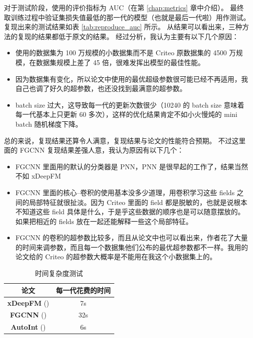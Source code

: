 \documentclass[degree=project,degree-type=project,cjk-font=noto]{thuthesis}
\begin{document}
对于测试阶段，使用的评价指标为 AUC（在第 \ref{chap:metrics} 章中介绍）。
最终取训练过程中验证集损失值最低的那一代的模型（也就是最后一代啦）用作测试。
复现出来的测试结果如表 \ref{tab:reproduce_auc} 所示。
从结果可以看出来，三种方法的复现的结果都低于原文的结果。
经过分析，我认为主要有以下几个原因：

\begin{itemize}
  \item 使用的数据集为 100 万规模的小数据集而不是 Criteo 原数据集的 4500 万规模，在数据集规模上差了 45 倍，很难发挥出模型的最佳性能。
  \item 因为数据集有变化，所以论文中使用的最优超级参数很可能已经不再适用，我自己也调了好久的超参数，也还没找到最满意的超参数。
  \item batch size 过大，这导致每一代的更新次数很少（10240 的 batch size 意味着每一代基本上只更新 60 多次），这样的优化结果肯定不如小火慢炖的 mini batch 随机梯度下降。
\end{itemize}

总的来说，复现结果还算令人满意，复现结果与论文的性能符合预期。
不过这里面的 FGCNN 复现结果差强人意，我认为原因有以下几个：

\begin{itemize}
  \item FGCNN 里面用的默认的分类器是 PNN，PNN 是很早起的工作了，结果当然不如 xDeepFM
  \item FGCNN 里面的核心--卷积的使用基本没多少道理，用卷积学习这些 fields 之间的局部特征就很扯淡。因为 Criteo 里面的 field 都是脱敏的，也就是说根本不知道这些 field 具体是什么，于是乎这些数据的顺序也是可以随意摆放的。如果把相近的 fields 放在一起还能解释一些这个局部特征。
  \item FGCNN 的卷积的超参数比较多，而且从论文中也可以看出来，作者花了大量的时间来调参数，而且每一个数据集他们公布的最优超参数都不一样。我用的论文给的 Criteo 的超参数大概率是不能用在我这个小数据集上的。
\end{itemize}

\begin{table}[htb]
  \centering
  \caption{时间复杂度测试}
  \label{tab:time_complex}
  \begin{tabular}{cc}
    \toprule
    \textbf{论文}         & \textbf{每一代花费的时间}  \\
    \midrule
    \textbf{xDeepFM} (\cite{xdeepfm}) & 7s \\
    \textbf{FGCNN} (\cite{fgcnn})           & 32s \\
    \textbf{AutoInt} (\cite{autoint})         & 6s \\
    \bottomrule
  \end{tabular}
\end{table}
\end{document}
